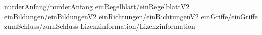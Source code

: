 
 {nurderAnfang/nurderAnfang}
 {einRegelblatt/einRegelblattV2}
 {einBildungen/einBildungenV2}
 {einRichtungen/einRichtungenV2}
 {einGriffe/einGriffe}
 {zumSchluss/zumSchluss}
 {Lizenzinformation/Lizenzinformation}

